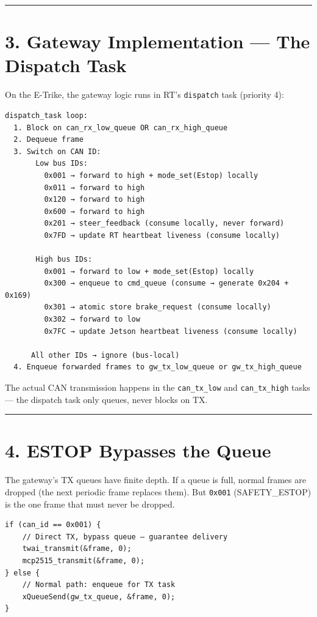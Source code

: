 \documentclass[12pt,a4paper,oneside]{report}
\begin{document}
\begin{center}\rule{0.5\linewidth}{0.5pt}\end{center}

\section{3. Gateway Implementation --- The Dispatch
Task}\label{gateway-implementation-the-dispatch-task}

On the E-Trike, the gateway logic runs in RT's \texttt{dispatch} task (priority
4):

\begin{verbatim}
dispatch_task loop:
  1. Block on can_rx_low_queue OR can_rx_high_queue
  2. Dequeue frame
  3. Switch on CAN ID:
       Low bus IDs:
         0x001 → forward to high + mode_set(Estop) locally
         0x011 → forward to high
         0x120 → forward to high
         0x600 → forward to high
         0x201 → steer_feedback (consume locally, never forward)
         0x7FD → update RT heartbeat liveness (consume locally)

       High bus IDs:
         0x001 → forward to low + mode_set(Estop) locally
         0x300 → enqueue to cmd_queue (consume → generate 0x204 + 0x169)
         0x301 → atomic store brake_request (consume locally)
         0x302 → forward to low
         0x7FC → update Jetson heartbeat liveness (consume locally)

      All other IDs → ignore (bus-local)
  4. Enqueue forwarded frames to gw_tx_low_queue or gw_tx_high_queue
\end{verbatim}

The actual CAN transmission happens in the \texttt{can\_tx\_low} and
\texttt{can\_tx\_high} tasks --- the dispatch task only queues, never blocks on
TX.

\begin{center}\rule{0.5\linewidth}{0.5pt}\end{center}

\section{4. ESTOP Bypasses the Queue}\label{estop-bypasses-the-queue}

The gateway's TX queues have finite depth. If a queue is full, normal frames are
dropped (the next periodic frame replaces them). But \texttt{0x001}
(SAFETY\_ESTOP) is the one frame that must never be dropped.

\begin{verbatim}
if (can_id == 0x001) {
    // Direct TX, bypass queue — guarantee delivery
    twai_transmit(&frame, 0);
    mcp2515_transmit(&frame, 0);
} else {
    // Normal path: enqueue for TX task
    xQueueSend(gw_tx_queue, &frame, 0);
}
\end{verbatim}
\end{document}
